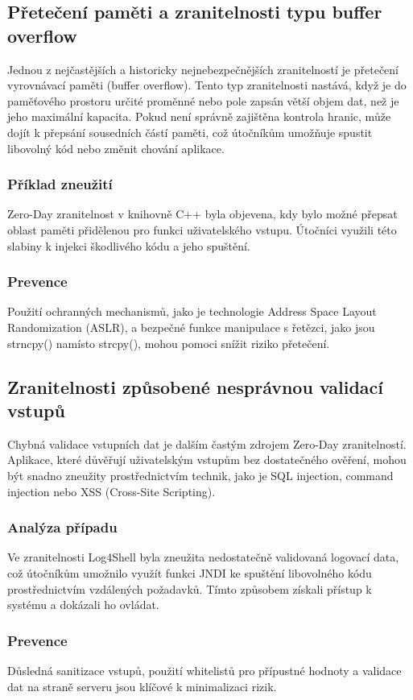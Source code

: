 \documentclass[11pt, conference, a4paper]{IEEEtran}
\begin{document}
\subsection{Přetečení paměti a zranitelnosti typu buffer overflow \cite{buff}}
Jednou z nejčastějších a historicky nejnebezpečnějších zranitelností je přetečení vyrovnávací paměti \cite{buff} (buffer overflow). Tento typ zranitelnosti nastává, když je do paměťového prostoru určité proměnné nebo pole zapsán větší objem dat, než je jeho maximální kapacita. Pokud není správně zajištěna kontrola hranic, může dojít k přepsání sousedních částí paměti, což útočníkům umožňuje spustit libovolný kód nebo změnit chování aplikace.

\subsubsection{Příklad zneužití} Zero-Day zranitelnost v knihovně C++ byla objevena, kdy bylo možné přepsat oblast paměti přidělenou pro funkci uživatelského vstupu. Útočníci využili této slabiny k injekci škodlivého kódu a jeho spuštění.
\subsubsection{Prevence} Použití ochranných mechanismů, jako je technologie Address Space Layout Randomization (ASLR), a bezpečné funkce manipulace s řetězci, jako jsou strncpy() namísto strcpy(), mohou pomoci snížit riziko přetečení.
\subsection{Zranitelnosti způsobené nesprávnou validací vstupů \cite{OWASP}}
Chybná validace vstupních dat je dalším častým zdrojem Zero-Day zranitelností. Aplikace, které důvěřují uživatelským vstupům bez dostatečného ověření, mohou být snadno zneužity prostřednictvím technik, jako je SQL injection, command injection nebo XSS (Cross-Site Scripting).

\subsubsection{Analýza případu} Ve zranitelnosti Log4Shell byla zneužita nedostatečně validovaná logovací data, což útočníkům umožnilo využít funkci JNDI ke spuštění libovolného kódu prostřednictvím vzdálených požadavků. Tímto způsobem získali přístup k systému a dokázali ho ovládat.
\subsubsection{Prevence}Důsledná sanitizace vstupů, použití whitelistů pro přípustné hodnoty a validace dat na straně serveru jsou klíčové k minimalizaci rizik.
\end{document}
